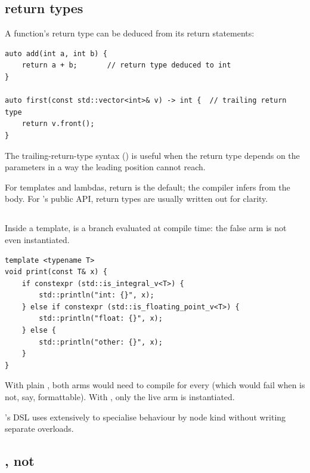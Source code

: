 \subsection{ return types}

A function's return type can be deduced from its return statements:

\begin{lstlisting}
auto add(int a, int b) {
    return a + b;       // return type deduced to int
}

auto first(const std::vector<int>& v) -> int {  // trailing return type
    return v.front();
}
\end{lstlisting}

The trailing-return-type syntax () is useful
when the return type depends on the parameters in a way the leading
position cannot reach.

For templates and lambdas,  return is the default; the
compiler infers from the body. For \maya{}'s public API, return
types are usually written out for clarity.

\subsection{}

Inside a template,  is a branch evaluated
at compile time: the false arm is not even instantiated.

\begin{lstlisting}
template <typename T>
void print(const T& x) {
    if constexpr (std::is_integral_v<T>) {
        std::println("int: {}", x);
    } else if constexpr (std::is_floating_point_v<T>) {
        std::println("float: {}", x);
    } else {
        std::println("other: {}", x);
    }
}
\end{lstlisting}

With plain , both arms would need to compile for every
 (which would fail when  is not, say,
formattable). With , only the live arm is
instantiated.

\maya{}'s DSL uses  extensively to specialise
behaviour by node kind without writing separate overloads.

\subsection{, not }

